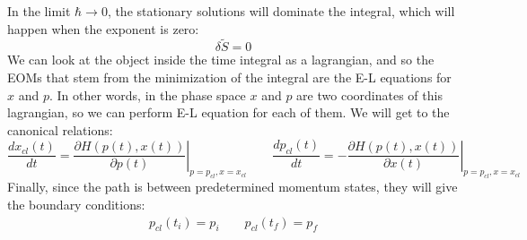 \documentclass{article}
\begin{document}
In the limit $\hbar \rightarrow 0$, the stationary solutions will dominate the integral, which will happen when the exponent is zero:
\begin{equation}
    \delta \tilde{S} = 0
\end{equation}
We can look at the object inside the time integral as a lagrangian, and so the EOMs that stem from the minimization of the integral are the E-L equations for $x$ and $p$. In other words, in the phase space $x$ and $p$ are two coordinates of this lagrangian, so we can perform E-L equation for each of them. We will get to the canonical relations:
\begin{equation}
\label{eq:canonical-relations}
    \frac{dx_{cl}(t)}{dt} = \left.\frac{\partial H(p(t),x(t))}{\partial p(t)}\right|_{p=p_{cl}, x=x_{cl}}
    \qquad
    \frac{dp_{cl}(t)}{dt} = -\left.\frac{\partial H(p(t),x(t))}{\partial x(t)}\right|_{p=p_{cl}, x=x_{cl}}
\end{equation} 
Finally, since the path is between predetermined momentum states, they will give the boundary conditions:
\begin{equation}
\begin{gathered}
    p_{cl}(t_i) = p_i \qquad p_{cl}(t_f) = p_f
\end{gathered}
\end{equation}
\end{document}
